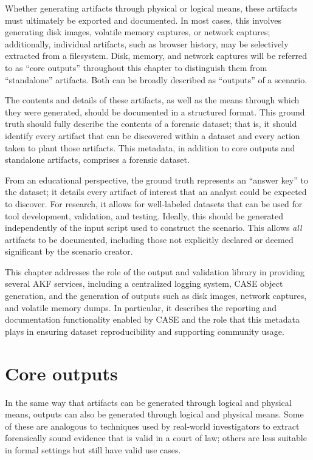 \documentclass[letterpaper,12pt]{report}
\begin{document}
Whether generating artifacts through physical or logical means, these
artifacts must ultimately be exported and documented. In most cases,
this involves generating disk images, volatile memory captures, or
network captures; additionally, individual artifacts, such as browser
history, may be selectively extracted from a filesystem. Disk, memory,
and network captures will be referred to as ``core outputs'' throughout
this chapter to distinguish them from ``standalone'' artifacts. Both can
be broadly described as ``outputs'' of a scenario.

The contents and details of these artifacts, as well as the means
through which they were generated, should be documented in a structured
format. This ground truth should fully describe the contents of a
forensic dataset; that is, it should identify every artifact that can be
discovered within a dataset and every action taken to plant those
artifacts. This metadata, in addition to core outputs and standalone
artifacts, comprises a forensic dataset.

From an educational perspective, the ground truth represents an ``answer
key'' to the dataset; it details every artifact of interest that an
analyst could be expected to discover. For research, it allows for
well-labeled datasets that can be used for tool development, validation,
and testing. Ideally, this should be generated independently of the
input script used to construct the scenario. This allows \emph{all}
artifacts to be documented, including those not explicitly declared or
deemed significant by the scenario creator.

This chapter addresses the role of the output and validation library in
providing several AKF services, including a centralized logging system,
CASE object generation, and the generation of outputs such as disk
images, network captures, and volatile memory dumps. In particular, it
describes the reporting and documentation functionality enabled by CASE
and the role that this metadata plays in ensuring dataset
reproducibility and supporting community usage.

\section{Core outputs}\label{core-outputs}

In the same way that artifacts can be generated through logical and
physical means, outputs can also be generated through logical and
physical means. Some of these are analogous to techniques used by
real-world investigators to extract forensically sound evidence that is
valid in a court of law; others are less suitable in formal settings but
still have valid use cases.
\end{document}
